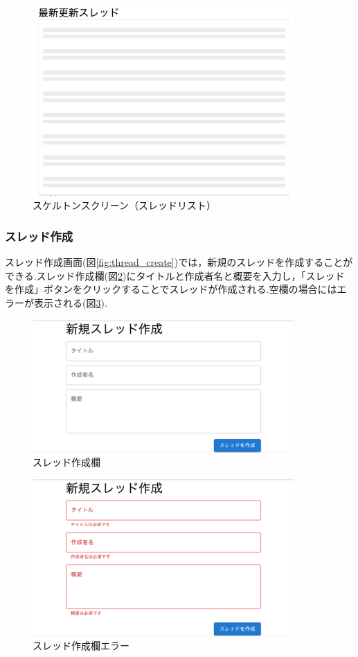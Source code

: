 \documentclass[b5paper,12pt,dvipdfmx]{jsreport}
\begin{document}
\begin{figure}[H]
	\centering
    \includegraphics[width=100mm,height=72.70mm]{./img/feature/thread_list_skeleton.png}
	\caption{スケルトンスクリーン（スレッドリスト）}
	\label{fig:thread_list_skeleton}
\end{figure}

\newpage

\subsubsection{スレッド作成}
スレッド作成画面(図\ref{fig:thread_create})では，新規のスレッドを作成することができる.スレッド作成欄(図\ref{fig:thread_textfield})にタイトルと作成者名と概要を入力し，「スレッドを作成」ボタンをクリックすることでスレッドが作成される.空欄の場合にはエラーが表示される(図\ref{fig:thread_textfield_error}).

\begin{figure}[H]
	\centering
    \includegraphics[width=100mm,height=50.81mm]{./img/feature/thread_textfield.png}
	\caption{スレッド作成欄}
	\label{fig:thread_textfield}
\end{figure}

\begin{figure}[H]
	\centering
    \includegraphics[width=100mm,height=60.05mm]{./img/feature/thread_textfield_error.png}
	\caption{スレッド作成欄エラー}
	\label{fig:thread_textfield_error}
\end{figure}
\end{document}
